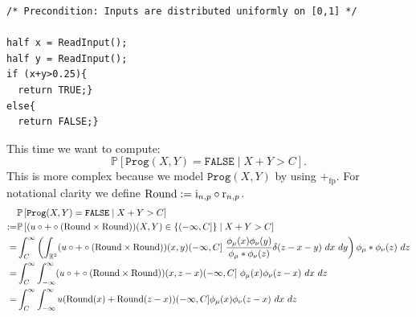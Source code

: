 \documentclass[10pt,a4paper]{article}
\theoremstyle{plain}
\newtheorem{lemma}[theorem]{Lemma}
\theoremstyle{definition}
\newcommand{\R}{\mathbb{R}}
\newcommand{\Rep}[1][n,p]{\mathrm{i}_{#1}}
\newcommand{\Round}[1][n,p]{\mathrm{r}_{#1}}
\newcommand{\ceil}[1]{\lceil #1 \rceil}
\newcommand{\floor}[1]{\lfloor #1 \rfloor}
\newcommand{\fp}{_{\mathrm{fp}}}
\newcommand{\Pro}[1]{\mathbb{P}\left[ #1 \right]}
\begin{document}
\begin{lstlisting}
/* Precondition: Inputs are distributed uniformly on [0,1] */

half x = ReadInput();
half y = ReadInput();
if (x+y>0.25){
  return TRUE;}
else{
  return FALSE;} 
\end{lstlisting}

This time we want to compute:
\[
\Pro{\mathtt{Prog}(X,Y)=\mathtt{FALSE}\mid X+Y> C}.
\]
This is more complex because we model $\mathtt{Prog}(X,Y)$ by using $+\fp$. For notational clarity we define $\rRound:=\Rep\circ \Round$.
\begin{align*}
&\Pro{\mathtt{Prog}(X,Y)=\mathtt{FALSE}\mid X+Y> C}\\
:=&\Pro{(u\circ + \circ (\rRound\times \rRound))(X,Y)\in\{(-\infty,C]\}\mid X+Y>C}\\
=&\int_{C}^{\infty}\left( \int_{\R^2}(u\circ + \circ (\rRound\times \rRound))(x,y)(-\infty,C]
~\frac{\phi_\mu(x)\phi_\nu(y)}{\phi_\mu\ast\phi_\nu(z)}\delta(z-x-y) ~dx~dy\right)\phi_\mu\ast\phi_\nu(z)~dz\\
=&\int_{C}^{\infty} \int_{-\infty}^\infty (u\circ + \circ (\rRound\times \rRound))(x,z-x)(-\infty,C]~\phi_\mu(x)\phi_\nu(z-x)~dx~dz\\
=&\int_{C}^{\infty} \int_{-\infty}^\infty u(\rRound(x)+\rRound(z-x))(-\infty,C]\phi_\mu(x)\phi_\nu(z-x)~dx~dz 
\end{align*}
\end{document}

